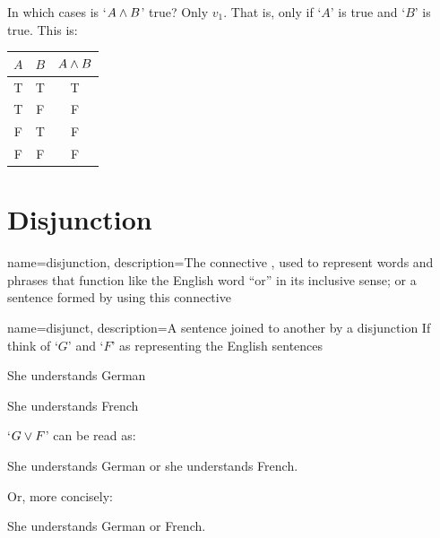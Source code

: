 In which cases is `$A\mathbin{\wedge} B$' true? Only $v_1$. That is, only if `$A$' is true and `$B$' is true. This is:
\begin{center}
	\begin{tabular}{cc|c}
	$A$&$B$&$A\mathbin{\wedge} B$\\\hline
	T&T&T\\
	T&F&F\\
	F&T&F\\
	F&F&F
\end{tabular}
\end{center}


\section{Disjunction}\label{sec:connectives-intro:disjunction}
{
	name=disjunction,
	description={The connective \eor, used to represent words and phrases that function like the English word ``or'' in its inclusive sense; or a sentence formed by using this connective}
}

{
	name=disjunct,
	description={A sentence joined to another by a \gls{disjunction}}
}
If think of `$G$' and `$F$' as representing the English sentences
\begin{ekey}
	\item[G] She understands German
	\item[F] She understands French
\end{ekey}
`$G\vee F$' can be read as:
\begin{samplesent}
	\item She understands German or she understands French.
\end{samplesent}
Or, more concisely:
\begin{samplesent}
	\item She understands German or French.
\end{samplesent}


